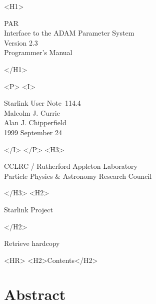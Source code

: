 \documentclass[twoside,11pt]{article}
\newcommand{\stardoccategory}  {Starlink User Note}
\newcommand{\stardocsource}    {sun\stardocnumber}
\newcommand{\stardocnumber}    {114.4}
\newcommand{\stardocauthors}   {Malcolm J. Currie\\
                                Alan J. Chipperfield}
\newcommand{\stardocdate}      {1999 September 24}
\newcommand{\stardoctitle}     {PAR \\ [\latex{1ex}]
                                Interface to the ADAM
                                Parameter System}
\newcommand{\stardocversion}   {Version 2.3}
\newcommand{\stardocmanual}    {Programmer's Manual}
\newcommand{\htmladdnormallink}[2]{#1}
\newcommand{\htmladdimg}[1]{}
\newcommand{\htmlref}[2]{#1}
\newcommand{\htmladdtonavigation}[1]{}
\newcommand{\xlabel}[1]{}
\newcommand{\latex}[1]{#1}
\begin{document}
\begin{htmlonly}
   \xlabel{}
   \begin{rawhtml} <H1> \end{rawhtml}
      \stardoctitle\\
      \stardocversion\\
      \stardocmanual
   \begin{rawhtml} </H1> \end{rawhtml}


   \begin{rawhtml} <P> <I> \end{rawhtml}
   \stardoccategory\ \stardocnumber \\
   \stardocauthors \\
   \stardocdate
   \begin{rawhtml} </I> </P> <H3> \end{rawhtml}
      \htmladdnormallink{CCLRC}{http://www.cclrc.ac.uk} /
      \htmladdnormallink{Rutherford Appleton Laboratory}
                        {http://www.cclrc.ac.uk/ral} \\
      \htmladdnormallink{Particle Physics \& Astronomy Research Council}
                        {http://www.pparc.ac.uk} \\
   \begin{rawhtml} </H3> <H2> \end{rawhtml}
      \htmladdnormallink{Starlink Project}{http://star-www.rl.ac.uk/}
   \begin{rawhtml} </H2> \end{rawhtml}
   \htmladdnormallink{\htmladdimg{source.gif} Retrieve hardcopy}
      {http://star-www.rl.ac.uk/cgi-bin/hcserver?\stardocsource}\\

  \label{stardoccontents}
  \begin{rawhtml} 
    <HR>
    <H2>Contents</H2>
  \end{rawhtml}
  \htmladdtonavigation{\htmlref{\htmladdimg{contents_motif.gif}}
        {stardoccontents}}

  \section{\xlabel{abstract}Abstract}
\end{htmlonly}
\end{document}
